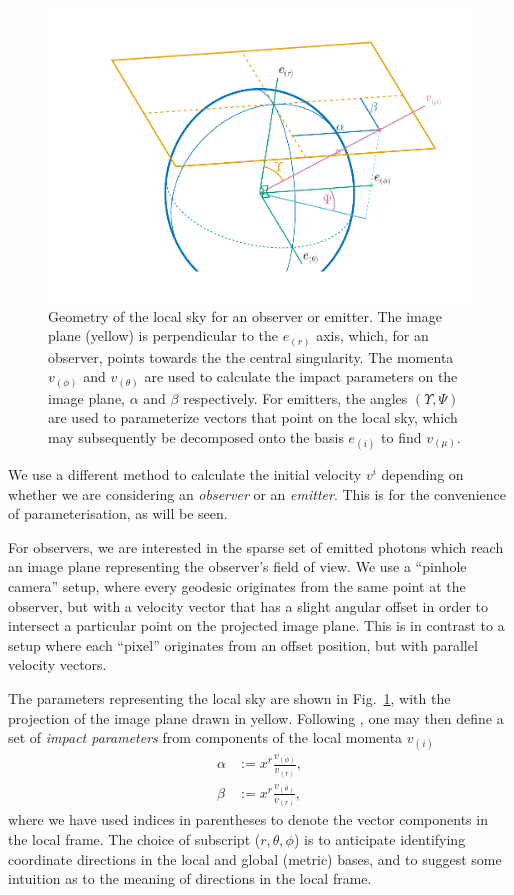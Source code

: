 \documentclass[fleqn,usenatbib]{mnras}
\begin{document}
\begin{figure}
    \centering
    \includegraphics[width=0.99\columnwidth]{figures/skycoords.pdf}
    \caption{
    Geometry of the local sky for an observer or emitter. The image plane
    (yellow) is perpendicular to the $e_{(r)}$ axis, which, for an observer,
    points towards the the central singularity. The momenta $v_{(\phi)}$ and
    $v_{(\theta)}$ are used to calculate the impact parameters on the image
    plane, $\alpha$ and $\beta$ respectively. For emitters, the angles
    $(\Upsilon, \Psi)$ are used to parameterize vectors that point on the local
    sky, which may subsequently be decomposed onto the basis $e_{(i)}$ to find
    $v_{(\mu)}$.
    }
    \label{fig:observer-coordinates}
\end{figure}

We use a different method to calculate the initial velocity $v^i$ depending on
whether we are considering an \emph{observer} or an \emph{emitter}. This is for
the convenience of parameterisation, as will be seen.

For observers, we are interested in the sparse set of emitted photons which
reach an image plane representing the observer's field of view. We use a
``pinhole camera'' setup, where every geodesic originates from the same point at
the observer, but with a velocity vector that has a slight angular offset in
order to intersect a particular point on the projected image plane. This is in
contrast to a setup where each ``pixel'' originates from an offset position, but
with parallel velocity vectors.

The parameters representing the local sky are shown in
Fig.~\ref{fig:observer-coordinates}, with the projection of the image plane
drawn in yellow. Following \citet{cunningham_optical_1973}, one may then define
a set of \emph{impact parameters} from components of the local momenta $v_{(i)}$
\begin{align}
    \alpha &:=  x^r \frac{v_{(\phi)}}{v_{(r)}}, \\
    \beta &:= x^r \frac{v_{(\theta)}}{v_{(r)}},
\end{align}
where we have used indices in parentheses to denote the vector components in the
local frame. The choice of subscript ($r, \theta, \phi$) is to anticipate
identifying coordinate directions in the local and global (metric) bases, and to
suggest some intuition as to the meaning of directions in the local frame.
\end{document}
